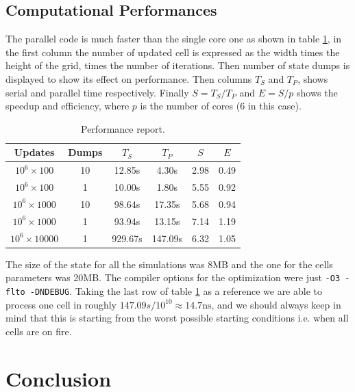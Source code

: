 \documentclass[Lau]{sapthesis} %
\let\oldsection\section
\def\subsection{\oldsection}
\def\section{\chapter}
\begin{document}
\subsection{Computational Performances}

The parallel code is much faster than the single core one as shown in table
\ref{tab:performance}, in the first column the number of updated cell is
expressed as the width times the height of the grid, times the number of
iterations. Then number of state dumps is displayed to show its effect on
performance. Then columns $T_S$ and $T_P$, shows serial and parallel time
respectively. Finally $S = T_S/T_P$ and $E = S/p$ shows the speedup and
efficiency, where $p$ is the number of cores (6 in this case).

\begin{table}
\centering
\begin{tabular}{|c|c|c|c|c|c|}
\hline
\textbf{Updates} & \textbf{Dumps} & \textbf{$T_S$} & \textbf{$T_P$} & \textbf{$S$} & \textbf{$E$}\\
\hline
$10^6\times 100$ & 10 & 12.85s & 4.30s & 2.98 & 0.49\\
$10^6\times 100$ & 1 & 10.00s & 1.80s & 5.55 & 0.92\\
$10^6\times 1000$ & 10 & 98.64s & 17.35s & 5.68 & 0.94\\
$10^6\times 1000$ & 1 & 93.94s & 13.15s & 7.14 & 1.19\\
$10^6\times 10000$ & 1 & 929.67s & 147.09s & 6.32 & 1.05\\
\hline
\end{tabular}
\caption{Performance report.}
\label{tab:performance}
\end{table}

The size of the state for all the simulations  was 8MB and the one for the cells
parameters was 20MB. The compiler options for the optimization were just
\texttt{-O3 -flto -DNDEBUG}. Taking the last row of table \ref{tab:performance}
as a reference we are able to process one cell in roughly $147.09s/10^{10}
\approx 14.7\textrm{ns}$, and we should always keep in mind that this is
starting from the worst possible starting conditions i.e. when all cells are on
fire.


\section{Conclusion}
\end{document}

